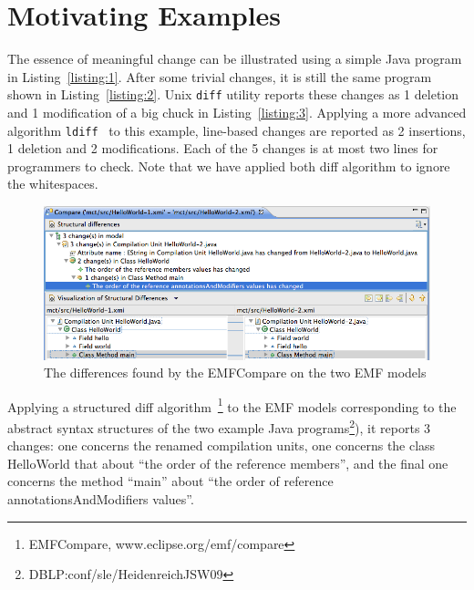 \documentclass[10pt, conference, compsocconf]{IEEEtran}
\begin{document}
\section{Motivating Examples}\label{sec:background}
The essence of meaningful change can be illustrated using a simple Java program in Listing~\ref{listing:1}.
After some trivial changes, it is still the same program shown in Listing~\ref{listing:2}.
Unix {\tt diff} utility reports these changes as 1 deletion and 1 modification of a big chuck in Listing~\ref{listing:3}. Applying a more advanced algorithm {\tt ldiff}~\cite{canfora09software} to this example, line-based changes are reported as 2 insertions, 1 deletion and 2 modifications. Each of the 5 changes is at most two lines for programmers to check. Note that we have applied both diff algorithm to ignore the whitespaces. 






\begin{figure}\centering
\includegraphics[width=\columnwidth]{code/emfcompare.png}
\caption{The differences found by the EMFCompare on the two EMF models}\label{fig:1}
\end{figure}
Applying a structured diff algorithm~\footnote{EMFCompare, www.eclipse.org/emf/compare} to the EMF models corresponding to the abstract syntax structures of the two example Java programs\footnote{DBLP:conf/sle/HeidenreichJSW09}), it reports 3 changes: one concerns the renamed compilation units, one concerns the class HelloWorld that about ``the order of the reference members'', and the final one concerns the method ``main'' about ``the order of reference annotationsAndModifiers values''. 
\end{document}
